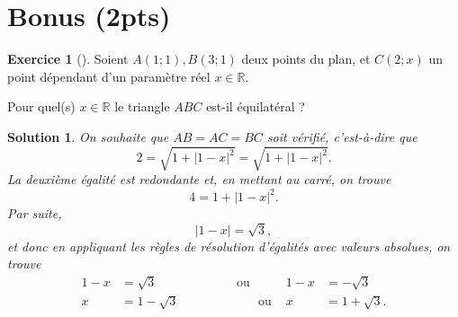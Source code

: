\documentclass[a4paper, 14pt]{extarticle}
\theoremstyle{plain}
\newtheorem*{sol}{Solution}
\theoremstyle{definition}
\newtheorem{ex}{Exercice}
\newcommand{\R}{\mathbb{R}}
\newcommand{\exe}[3]{
		\begin{ex}[#3] #1  \end{ex}
		\begin{sol} #2 \end{sol}
	}
\newcommand{\exe}[3]{
		\begin{ex}[#3] #1  \end{ex}
	}
\begin{document}
\section*{Bonus (2pts)}

\exe{
	Soient $A(1;1), B(3;1)$ deux points du plan, et $C(2;x)$ un point dépendant d'un paramètre réel $x\in\R$.
	
	Pour quel(s) $x\in\R$ le triangle $ABC$ est-il équilatéral ?
}{
	On souhaite que $AB = AC = BC$ soit vérifié, c'est-à-dire que
		\[ 2 = \sqrt{1 + |1-x|^2} = \sqrt{1 + |1-x|^2}. \]
	La deuxième égalité est redondante et, en mettant au carré, on trouve
		\[ 4 = 1 + |1-x|^2. \]
	Par suite,
		\[ |1-x| = \sqrt{3}, \]
	et donc en appliquant les règles de résolution d'égalités avec valeurs absolues, on trouve
		\begin{align*}
			1-x &= \sqrt{3} \qquad\qquad\qquad \text{ ou } & 1-x &= -\sqrt{3} \\
			x &= 1-\sqrt{3} \qquad \qquad\qquad\text{ ou } & x &= 1 +\sqrt{3}.
		\end{align*}
}{}
\end{document}
